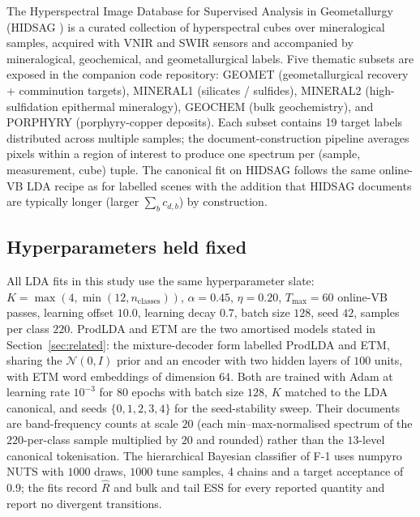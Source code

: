 \documentclass[journal,a4paper,10pt]{IEEEtran}
\begin{document}
The Hyperspectral Image Database for Supervised Analysis in
Geometallurgy (HIDSAG \cite{hidsag2023,hidsag2023figshare}) is a
curated collection of hyperspectral cubes over mineralogical samples,
acquired with VNIR and SWIR sensors and accompanied by mineralogical,
geochemical, and geometallurgical labels. Five thematic subsets are
exposed in the companion code repository: GEOMET (geometallurgical
recovery + comminution targets), MINERAL1 (silicates / sulfides),
MINERAL2 (high-sulfidation epithermal mineralogy), GEOCHEM (bulk
geochemistry), and
PORPHYRY (porphyry-copper deposits). Each subset contains 19 target
labels distributed across multiple samples; the document-construction
pipeline averages pixels within a region of interest to produce one
spectrum per (sample, measurement, cube) tuple. The canonical fit on
HIDSAG follows the same online-VB LDA recipe as for labelled scenes
with the addition that HIDSAG documents are typically longer (larger
$\sum_b c_{d,b}$) by construction.

\subsection{Hyperparameters held fixed}
\label{subsec:hyper}

All LDA fits in this study use the same hyperparameter slate:
$K = \max(4, \min(12, n_{\text{classes}}))$, $\alpha = 0.45$,
$\eta = 0.20$, $T_{\max} = 60$ online-VB passes, learning offset
$10.0$, learning decay $0.7$, batch size $128$, seed $42$, samples per
class $220$. ProdLDA and ETM are the two amortised models stated in
Section~\ref{sec:related}: the mixture-decoder form labelled ProdLDA
and ETM, sharing the $\mathcal{N}(0, I)$ prior and an encoder with two
hidden layers of $100$ units, with ETM word embeddings of dimension
$64$. Both are trained with Adam at learning rate $10^{-3}$ for $80$
epochs with batch size $128$, $K$ matched to the LDA canonical, and
seeds $\{0, 1, 2, 3, 4\}$ for the seed-stability sweep. Their documents
are band-frequency counts at scale $20$ (each min--max-normalised
spectrum of the $220$-per-class sample multiplied by $20$ and rounded)
rather than the $13$-level canonical tokenisation. The hierarchical
Bayesian classifier of F-1 uses numpyro NUTS with $1000$ draws,
$1000$ tune samples, 4 chains and a target acceptance of 0.9; the fits
record $\widehat{R}$ and bulk and tail ESS for every reported quantity
and report no divergent transitions.

\end{document}
